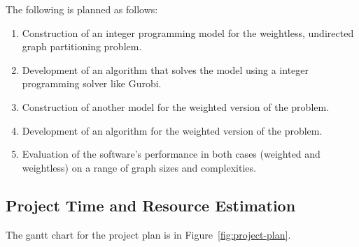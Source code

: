 \documentclass[a4paper,12pt]{report}
\begin{document}
The following is planned as follows:
\begin{enumerate}
	\item Construction of an integer programming model for the weightless, undirected graph partitioning problem.
	\item Development of an algorithm that solves the model using a integer programming solver like Gurobi.
	\item Construction of another model for the weighted version of the problem.
	\item Development of an algorithm for the weighted version of the problem.
	\item Evaluation of the software's performance in both cases (weighted and weightless) on a range of graph sizes and complexities.
\end{enumerate}

\subsection{Project Time and Resource Estimation}

The gantt chart for the project plan is in Figure~\ref{fig:project-plan}.
\end{document}
